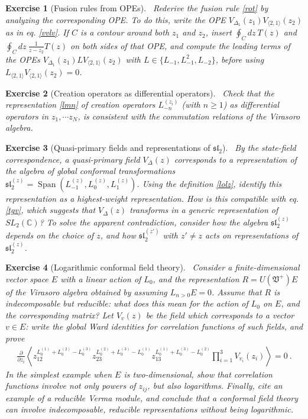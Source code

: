 \documentclass[12pt,a4paper,notitlepage]{report}
\numberwithin{equation}{section}
\theoremstyle{break}
\newtheorem{exo}{Exercise}[chapter]
\begin{document}
\begin{exo}[Fusion rules from OPEs]
 ~\label{exooit}
Rederive the fusion rule \eqref{rot} by analyzing the corresponding OPE.
To do this, write the OPE $V_{\Delta_1}(z_1)V_{\langle 2,1 \rangle}(z_2)$ as in eq. \eqref{vvlv}.
If $C$ is a contour around both $z_1$ and $z_2$, insert $\oint_C dz\ T(z)$ and $\oint_C dz\ \frac{1}{z-z_2}T(z)$ on both sides of that OPE, and compute the leading terms of the OPEs $V_{\Delta_1}(z_1) LV_{\langle 2,1 \rangle}(z_2)$ with $L\in\{L_{-1},L_{-1}^2,L_{-2}\}$, before using $L_{\langle 2,1 \rangle} V_{\langle 2,1 \rangle} (z_2) =0$. 
\end{exo}

\begin{exo}[Creation operators as differential operators]
 ~\label{exodma}
 Check that the representation \eqref{lmn} of creation operators $L_{-n}^{(z_i)}$ (with $n\geq 1$) as differential operators in $z_1,\cdots z_N$, is consistent with the commutation relations of the Virasoro algebra. 
\end{exo}

\begin{exo}[Quasi-primary fields and representations of $\mathfrak{sl}_2$]
 ~\label{exoqp}
By the state-field correspondence, a quasi-primary field $V_\Delta(z)$ corresponds to a representation of the algebra of global conformal transformations $\mathfrak{sl}_2^{(z)} = \operatorname{Span}(L_{-1}^{(z)},L_0^{(z)},L_1^{(z)})$.
Using the definition \eqref{lolz}, identify this representation as a highest-weight representation.
How is this compatible with eq. \eqref{tgv}, which suggests that $V_\Delta(z)$ transforms in a generic representation of $SL_2({\mathbb{C}})$? To solve the apparent contradiction, consider how the algebra $\mathfrak{sl}_2^{(z)}$ depends on the choice of $z$, and how $\mathfrak{sl}_2^{(z')}$ with $z'\neq z$ acts on representations of $\mathfrak{sl}_2^{(z)}$.
\end{exo}

\begin{exo}[Logarithmic conformal field theory]
 ~\label{exolog}
Consider a finite-dimensional vector space $E$ with a linear action of $L_0$, and the representation $R=U(\mathfrak{V}^+)E$ of the Virasoro algebra obtained by assuming $L_{n>0}E=0$.
Assume that $R$ is indecomposable but reducible: what does this mean for the action of $L_0$ on $E$, and the corresponding matrix? Let $V_v(z)$ be the field which corresponds to a vector $v\in E$: write the global Ward identities for correlation functions of such fields, and prove 
\begin{align}
 {\frac{\partial}{\partial z_i}} \left\langle z_{12}^{L_0^{(1)}+L_0^{(2)}-L_0^{(3)}} z_{23}^{L_0^{(2)}+L_0^{(3)}-L_0^{(1)}} z_{13}^{L_0^{(1)}+L_0^{(3)}-L_0^{(2)}} \prod_{i=1}^3 V_{v_i}(z_i)\right\rangle = 0\ .
\end{align}
In the simplest example when $E$ is two-dimensional, show that correlation functions involve not only powers of $z_{ij}$, but also logarithms.
Finally, cite an example of a reducible Verma module, and conclude that 
a conformal field theory can involve indecomposable, reducible representations without being logarithmic. 
\end{exo}
\end{document}
